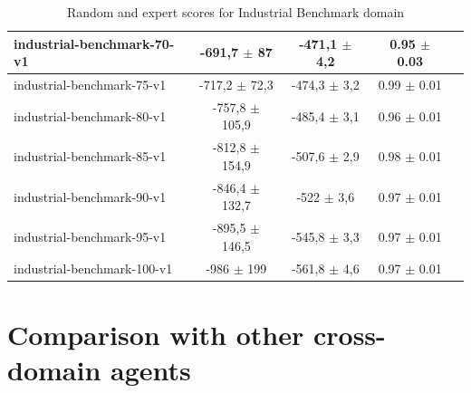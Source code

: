 \documentclass{article}
\theoremstyle{plain}
\theoremstyle{definition}
\theoremstyle{remark}
\begin{document}
\begin{table}[]
{\begin{tabular}{|l|c|c|c|c|}
industrial-benchmark-70-v1  & -691,7 $\pm$ 87    & -471,1 $\pm$ 4,2 &               0.95 $\pm$ 0.03     \\ \hline
industrial-benchmark-75-v1  & -717,2 $\pm$ 72,3  & -474,3 $\pm$ 3,2 &               0.99 $\pm$ 0.01     \\ \hline
industrial-benchmark-80-v1  & -757,8 $\pm$ 105,9 & -485,4 $\pm$ 3,1 &               0.96 $\pm$ 0.01     \\ \hline
industrial-benchmark-85-v1  & -812,8 $\pm$ 154,9 & -507,6 $\pm$ 2,9 &               0.98 $\pm$ 0.01     \\ \hline
industrial-benchmark-90-v1  & -846,4 $\pm$ 132,7 & -522 $\pm$ 3,6   &               0.97 $\pm$ 0.01     \\ \hline
industrial-benchmark-95-v1  & -895,5 $\pm$ 146,5 & -545,8 $\pm$ 3,3 &               0.97 $\pm$ 0.01     \\ \hline
industrial-benchmark-100-v1 & -986 $\pm$ 199     & -561,8 $\pm$ 4,6 &               0.97 $\pm$ 0.01     \\ \hline
\end{tabular}}
\caption{Random and expert scores for Industrial Benchmark domain}
\end{table}

\section{Comparison with other cross-domain agents}\label{appendix:comparison}
\end{document}
